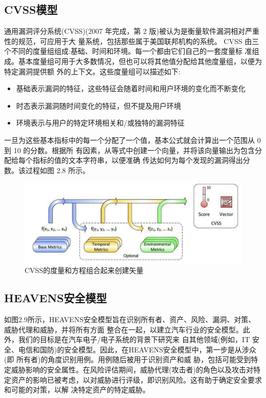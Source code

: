 \subsection{CVSS模型}

通用漏洞评分系统(CVSS)(2007 年完成，第 2 版)被认为是衡量软件漏洞相对严重性的规范，可应用于大
量系统，包括那些属于美国联邦机构的系统\cite{mell2007common}。
CVSS 由三个不同的度量组组成:基础、时间和环境。每一个都由它们自己的一套度量标
准组成。基本度量组可用于大多数情况，但也可以将其他值分配给其他度量组，以便为特定漏洞提供额
外的上下文。这些度量组可以描述如下:
\begin{itemize}
    \item  基础表示漏洞的特征，这些特征会随着时间和用户环境的变化而不断变化
    \item  时态表示漏洞随时间变化的特征，但不提及用户环境
    \item  环境表示与用户的特定环境相关和/或独特的漏洞特征
\end{itemize}

一旦为这些基本指标中的每一个分配了一个值，基本公式就会计算出一个范围从 0 到 10 的分数。根据所
有因素，从等式中创建一个向量，并将该向量输出为包含分配给每个指标的值的文本字符串，以便准确
传达如何为每个发现的漏洞得出分数。该过程如图 2.8 所示。
\begin{figure}
    \centering
    \includegraphics[scale=0.6]{resources/img/i9.png}
    \caption{CVSS的度量和方程组合起来创建矢量}
  \end{figure}

  \subsection{HEAVENS安全模型}
  如图2.9所示，HEAVENS安全模型\cite{haringajoint}旨在识别所有者、资产、风险、漏洞、对策、威胁代理和威胁，并将所有方面
整合在一起，以建立汽车行业的安全模型。此外，我们的目标是在汽车电子/电子系统的背景下研究来
自其他领域(例如，IT 安全、电信和国防)的安全模型。因此，在HEAVENS安全模型中，第一步是从涉众(即
所有者)的角度识别用例。用例随后被用于识别资产和威
胁，包括可能受到特定威胁影响的安全属性。在风险评估期间，威胁代理(攻击者)的角色以及攻击对特
定资产的影响已被考虑，以对威胁进行评级，即识别风险。这有助于确定安全要求和可能的对策，以解
决特定资产的特定威胁。

